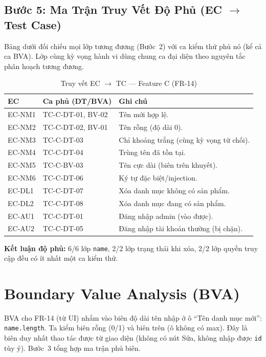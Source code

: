 \documentclass[12pt, a4paper]{report}
\begin{document}
\subsection{Bước 5: Ma Trận Truy Vết Độ Phủ (EC $\to$ Test Case)}
Bảng dưới đối chiếu mọi lớp tương đương (Bước~2) với ca kiểm thử phủ nó (kể cả ca BVA). Lớp cùng
kỳ vọng hành vi dùng chung ca đại diện theo nguyên tắc phân hoạch tương đương.

\begin{table}[H]
    \centering
    \caption{Truy vết EC $\to$ TC — Feature C (FR-14)}
    \begin{tabularx}{\linewidth}{C{1.8cm} C{3.4cm} X}
        \toprule
        \textbf{EC} & \textbf{Ca phủ (DT/BVA)} & \textbf{Ghi chú} \\
        \midrule
        EC-NM1 & TC-C-DT-01, BV-02 & Tên mới hợp lệ. \\
        EC-NM2 & TC-C-DT-02, BV-01 & Tên rỗng (độ dài 0). \\
        EC-NM3 & TC-C-DT-03 & Chỉ khoảng trắng (cùng kỳ vọng từ chối). \\
        EC-NM4 & TC-C-DT-04 & Trùng tên đã tồn tại. \\
        EC-NM5 & TC-C-BV-03 & Tên cực dài (biên trên khuyết). \\
        EC-NM6 & TC-C-DT-06 & Ký tự đặc biệt/injection. \\
        EC-DL1 & TC-C-DT-07 & Xóa danh mục không có sản phẩm. \\
        EC-DL2 & TC-C-DT-08 & Xóa danh mục đang có sản phẩm. \\
        EC-AU1 & TC-C-DT-01 & Đăng nhập admin (vào được). \\
        EC-AU2 & TC-C-DT-05 & Đăng nhập tài khoản thường (bị chặn). \\
        \bottomrule
    \end{tabularx}
\end{table}
\noindent\textbf{Kết luận độ phủ:} 6/6 lớp \texttt{name}, 2/2 lớp trạng thái khi xóa, 2/2 lớp
quyền truy cập đều có ít nhất một ca kiểm thử.

\section{Boundary Value Analysis (BVA)}

BVA cho FR-14 (từ UI) nhắm vào biên độ dài tên nhập ở ô ``Tên danh mục mới'':
\texttt{name.length}. Ta kiểm biên rỗng (0/1) và biên trên (ô không có max). Đây là biên duy
nhất thao tác được từ giao diện (không có nút Sửa, không nhập được \texttt{id} tùy ý). Bước~3
tổng hợp ma trận phủ biên.
\end{document}
